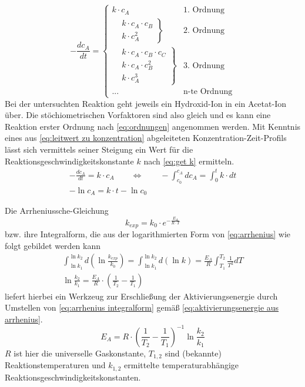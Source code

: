 	\begin{equation}
		-\frac{dc_A}{dt} =
		\begin{cases}
			k \cdot c_A & \text{1. Ordnung} \\
			\left.
			\begin{aligned}
				&k \cdot c_A \cdot c_B \\
				&k \cdot c_A^2
			\end{aligned}\right\} &\text{2. Ordnung} \\
			\left.
			\begin{aligned}
				&k \cdot c_A \cdot c_B \cdot c_C \\
				&k \cdot c_A \cdot c_B^2 \\
				&k \cdot c_A^3
			\end{aligned}\right\} &\text{3. Ordnung} \\ 
			... & \text{n-te Ordnung}
		\end{cases}
		\label{eq:ordnungen}
	\end{equation}
	Bei der untersuchten Reaktion geht jeweils ein Hydroxid-Ion in ein Acetat-Ion über. Die stöchiometrischen Vorfaktoren sind also
	gleich und es kann eine Reaktion erster Ordnung nach \cref{eq:ordnungen} angenommen werden. Mit Kenntnis eines aus \cref{eq:leitwert zu konzentration}
	abgeleiteten Konzentration-Zeit-Profils lässt sich vermittels seiner Steigung ein Wert für die Reaktionsgeschwindigkeitskonstante \(k\)
	nach \cref{eq:get k} ermitteln.
	\begin{gather}
		-\frac{dc_A}{dt} = k \cdot c_A \qquad \Leftrightarrow \qquad -\int_{c_0}^{c_A} dc_A = \int_{0}^t k \cdot dt \nonumber \\
		-\ln{c_A} = k \cdot t - \ln{c_0}
		\label{eq:get k}
	\end{gather}\par\medskip
	Die Arrheniussche-Gleichung \cite{Einstieg.in.die.Physikalische.Chemie.fuer.Nebenfaechler.Bechmann.2016}
	\begin{equation}
		k_{exp} = k_0 \cdot e^{-\frac{E_A}{R \cdot T}}
		\label{eq:arrhenius}
	\end{equation}
	bzw. ihre Integralform, die aus der logarithmierten Form von \cref{eq:arrhenius} wie folgt gebildet werden kann
	\begin{gather}
		\int_{\ln{k_1}}^{\ln{k_2}} d\left(\ln{\frac{k_{exp}}{k_0}}\right) = \int_{\ln{k_1}}^{\ln{k_2}} d(\ln{k}) = \frac{E_A}{R} \int_{T_1}^{T_2} \frac{1}{T^2} dT \nonumber \\
		\ln{\frac{k_2}{k_1}} = \frac{E_A}{R} \cdot \left(\frac{1}{T_2} - \frac{1}{T_1}\right)
		\label{eq:arrhenius integralform}
	\end{gather}
	liefert hierbei ein Werkzeug zur Erschließung der Aktivierungsenergie durch Umstellen von \cref{eq:arrhenius integralform} gemäß \cref{eq:aktivierungsenergie aus arrhenius}.
	\begin{equation}
		E_A = R \cdot \left(\frac{1}{T_2} - \frac{1}{T_1}\right)^{-1} \ln{\frac{k_2}{k_1}}
		\label{eq:aktivierungsenergie aus arrhenius}
	\end{equation}
	\(R\) ist hier die universelle Gaskonstante, \(T_{1,2}\) sind (bekannte) Reaktionstemperaturen und \(k_{1,2}\)
	ermittelte temperaturabhängige Reaktionsgeschwindigkeitskonstanten.
